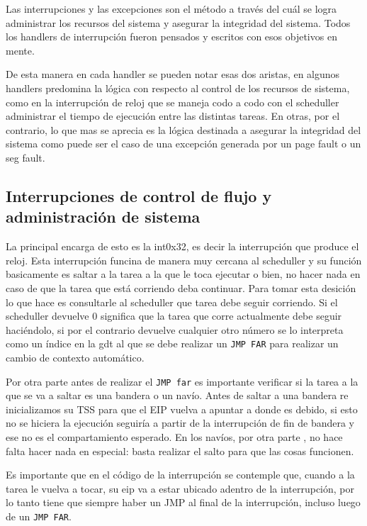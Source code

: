 	Las interrupciones y las excepciones son el método
a través del cuál se logra administrar los recursos del sistema y asegurar
la integridad del sistema. Todos los handlers de interrupción fueron
pensados y escritos con esos objetivos en mente.

	De esta manera en cada handler se pueden notar esas dos aristas,
en algunos handlers predomina la lógica con respecto al control de los
recursos de sistema, como en la interrupción de reloj que se maneja codo
a codo con el scheduller administrar el tiempo de ejecución entre
las distintas tareas. En otras, por el contrario, lo que mas se aprecia
es la lógica destinada a asegurar la integridad del sistema como puede
ser el caso de una excepción generada por un page fault o un seg fault.

\subsection{Interrupciones de control de flujo y administración de sistema}

	
	La principal encarga de esto es la int0x32, es decir la interrupción
que produce el reloj. Esta interrupción funcina de manera muy cercana al scheduller
y su función basicamente es saltar a la tarea a la que le toca ejecutar o
bien, no hacer nada en caso de que la tarea que está corriendo deba continuar.
Para tomar esta desición lo que hace es consultarle al scheduller que tarea
debe seguir corriendo. Si el scheduller devuelve 0 significa que la tarea
que corre actualmente debe seguir haciéndolo, si por el contrario
devuelve cualquier otro número se lo interpreta como un índice en
la gdt al que se debe realizar un \texttt{JMP FAR} para realizar un cambio
de contexto automático.

	Por otra parte antes de realizar el \texttt{JMP far} es importante
verificar si la tarea a la que se va a saltar es una bandera o un
navío. Antes de saltar a una bandera re inicializamos su TSS para
que el EIP vuelva a apuntar a donde es debido, si esto no se hiciera
la ejecución seguiría a partir de la interrupción de fin de bandera
y ese no es el compartamiento esperado. En los navíos, por otra parte
, no hace falta hacer nada en especial: basta realizar el salto
para que las cosas funcionen.

	Es importante que en el código de la interrupción se contemple
que, cuando a la tarea le vuelva a tocar, su eip va a estar ubicado adentro
de la interrupción, por lo tanto tiene que siempre haber un JMP al
final de la interrupción, incluso luego de un \texttt{JMP FAR}.
	

